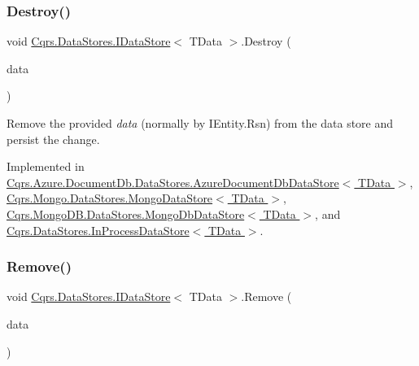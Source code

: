 \subsubsection{\texorpdfstring{Destroy()}{Destroy()}}
{\footnotesize\ttfamily void \hyperlink{interfaceCqrs_1_1DataStores_1_1IDataStore}{Cqrs.\+Data\+Stores.\+I\+Data\+Store}$<$ T\+Data $>$.Destroy (\begin{DoxyParamCaption}\item[{T\+Data}]{data }\end{DoxyParamCaption})}



Remove the provided {\itshape data}  (normally by I\+Entity.\+Rsn) from the data store and persist the change. 



Implemented in \hyperlink{classCqrs_1_1Azure_1_1DocumentDb_1_1DataStores_1_1AzureDocumentDbDataStore_affe39fe57e590555256258fa6c568c29_affe39fe57e590555256258fa6c568c29}{Cqrs.\+Azure.\+Document\+Db.\+Data\+Stores.\+Azure\+Document\+Db\+Data\+Store$<$ T\+Data $>$}, \hyperlink{classCqrs_1_1Mongo_1_1DataStores_1_1MongoDataStore_af97319aef1f0484666d9ea12578b8df9_af97319aef1f0484666d9ea12578b8df9}{Cqrs.\+Mongo.\+Data\+Stores.\+Mongo\+Data\+Store$<$ T\+Data $>$}, \hyperlink{classCqrs_1_1MongoDB_1_1DataStores_1_1MongoDbDataStore_a4650c780f34e320ba39f312e3b04555d_a4650c780f34e320ba39f312e3b04555d}{Cqrs.\+Mongo\+D\+B.\+Data\+Stores.\+Mongo\+Db\+Data\+Store$<$ T\+Data $>$}, and \hyperlink{classCqrs_1_1DataStores_1_1InProcessDataStore_a1fc7a3935f52087f3703b652e77f0b75_a1fc7a3935f52087f3703b652e77f0b75}{Cqrs.\+Data\+Stores.\+In\+Process\+Data\+Store$<$ T\+Data $>$}.

\mbox{\label{interfaceCqrs_1_1DataStores_1_1IDataStore_a7ef540796bbe4257296841590bc23478_a7ef540796bbe4257296841590bc23478}} 
\subsubsection{\texorpdfstring{Remove()}{Remove()}}
{\footnotesize\ttfamily void \hyperlink{interfaceCqrs_1_1DataStores_1_1IDataStore}{Cqrs.\+Data\+Stores.\+I\+Data\+Store}$<$ T\+Data $>$.Remove (\begin{DoxyParamCaption}\item[{T\+Data}]{data }\end{DoxyParamCaption})}



